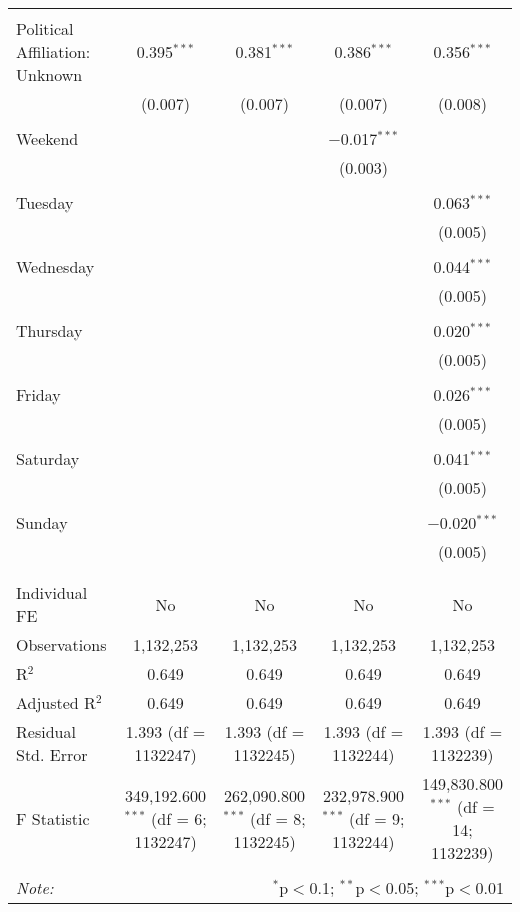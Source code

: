 \documentclass[
]{article}
\begin{document}
\begin{table}[!htbp]
{\begin{tabular}{@{\extracolsep{5pt}}lcccc}
  & & & & \\ 
 Political Affiliation: Unknown & 0.395$^{***}$ & 0.381$^{***}$ & 0.386$^{***}$ & 0.356$^{***}$ \\ 
  & (0.007) & (0.007) & (0.007) & (0.008) \\ 
  & & & & \\ 
 Weekend &  &  & $-$0.017$^{***}$ &  \\ 
  &  &  & (0.003) &  \\ 
  & & & & \\ 
 Tuesday &  &  &  & 0.063$^{***}$ \\ 
  &  &  &  & (0.005) \\ 
  & & & & \\ 
 Wednesday &  &  &  & 0.044$^{***}$ \\ 
  &  &  &  & (0.005) \\ 
  & & & & \\ 
 Thursday &  &  &  & 0.020$^{***}$ \\ 
  &  &  &  & (0.005) \\ 
  & & & & \\ 
 Friday &  &  &  & 0.026$^{***}$ \\ 
  &  &  &  & (0.005) \\ 
  & & & & \\ 
 Saturday &  &  &  & 0.041$^{***}$ \\ 
  &  &  &  & (0.005) \\ 
  & & & & \\ 
 Sunday &  &  &  & $-$0.020$^{***}$ \\ 
  &  &  &  & (0.005) \\ 
  & & & & \\ 
\hline \\[-1.8ex] 
Individual FE & No & No & No & No \\ 
Observations & 1,132,253 & 1,132,253 & 1,132,253 & 1,132,253 \\ 
R$^{2}$ & 0.649 & 0.649 & 0.649 & 0.649 \\ 
Adjusted R$^{2}$ & 0.649 & 0.649 & 0.649 & 0.649 \\ 
Residual Std. Error & 1.393 (df = 1132247) & 1.393 (df = 1132245) & 1.393 (df = 1132244) & 1.393 (df = 1132239) \\ 
F Statistic & 349,192.600$^{***}$ (df = 6; 1132247) & 262,090.800$^{***}$ (df = 8; 1132245) & 232,978.900$^{***}$ (df = 9; 1132244) & 149,830.800$^{***}$ (df = 14; 1132239) \\ 
\hline 
\hline \\[-1.8ex] 
\textit{Note:}  & \multicolumn{4}{r}{$^{*}$p$<$0.1; $^{**}$p$<$0.05; $^{***}$p$<$0.01} \\ 
\end{tabular}
} 
\end{table} 
\newpage
\end{document}
